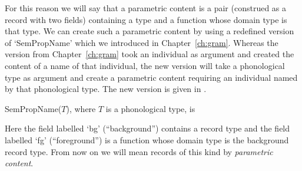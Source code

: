 For this reason we will say that a parametric content is a pair
(construed as a record with two fields) containing a type and a
function whose domain type is that type.  We can create such a
parametric content by using a redefined version of `SemPropName' which
we introduced in Chapter~\ref{ch:gram}.  Whereas the version from
Chapter~\ref{ch:gram} took an individual as argument and created the
content of a name of that individual, the new version will take a
phonological type as argument and create a parametric content
requiring an individual named by that phonological type.  The new
version is given in \nexteg{}.
\begin{ex} 
SemPropName($T$), where $T$ is a phonological type,
is

\label{ex:SemPropName-chpropnames} 
\end{ex}
Here the field labelled `bg' (``background'') contains a record type
and the field labelled `fg' (``foreground'') is a function whose
domain type is the background record type.  From now on we will mean
records of this kind by \textit{parametric content}.

